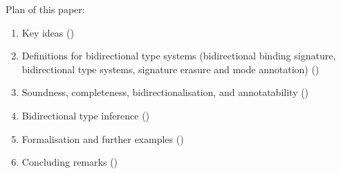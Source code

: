 Plan of this paper:
\begin{enumerate}
  \item Key ideas ()
  \item Definitions for bidirectional type systems (bidirectional binding signature, bidirectional type systems, signature erasure and mode annotation) ()
  \item Soundness, completeness, bidirectionalisation, and annotatability ()
  \item Bidirectional type inference ()
  \item Formalisation and further examples ()
  \item Concluding remarks ()
\end{enumerate}



